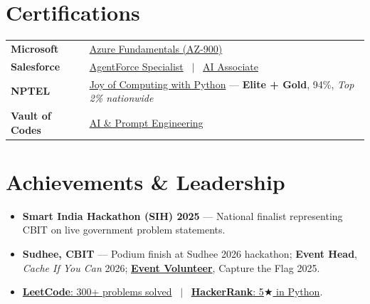 \documentclass[a4paper,10.5pt]{article}
\begin{document}
\section{Certifications}
\vspace{1pt}
\begin{tabularx}{\linewidth}{@{}l X@{}}
\textbf{Microsoft}      & \href{https://drive.google.com/file/d/1Uj9T80eRGSfT8G-HdICgMUi--92Ffz_9/view?usp=share_link}{Azure Fundamentals (AZ-900)} \\[2pt]
\textbf{Salesforce}     & \href{https://drive.google.com/file/d/1ig8ZAgni9Ml1-eQw-yYwkyeQZiyzHk-t/view?usp=share_link}{AgentForce Specialist} \ $|$ \ \href{https://drive.google.com/file/d/12eKyzIrdg2E9JL7Ei6M3PfhkW0PfKh1l/view?usp=sharing}{AI Associate} \\[2pt]
\textbf{NPTEL}          & \href{https://drive.google.com/file/d/1xy7yMiITQlHQ5rMfqnr1E25GgKLNywxe/view?usp=share_link}{Joy of Computing with Python} --- \textbf{Elite + Gold}, 94\%, \textit{Top 2\% nationwide} \\[2pt]
\textbf{Vault of Codes} & \href{https://drive.google.com/file/d/1ZCG5hGw_KajViTB6CHOn3X3Br9BgI-SM/view?usp=share_link}{AI \& Prompt Engineering} \\
\end{tabularx}

\section{Achievements \& Leadership}
\vspace{1pt}
\begin{itemize}[nosep, leftmargin=1.5em, itemsep=1pt]
  \item[--] \textbf{Smart India Hackathon (SIH) 2025} --- National finalist representing CBIT on live government problem statements.
  \item[--] \textbf{Sudhee, CBIT} --- Podium finish at Sudhee 2026 hackathon; \textbf{Event Head}, \textit{Cache If You Can} 2026; \href{https://drive.google.com/file/d/1yupQx853bTCgPQpJUgdcno5PdC6kmpVC/view?usp=share_link}{\textbf{Event Volunteer}}, Capture the Flag 2025.
  \item[--] \href{https://leetcode.com/u/SESH_MANUVARTHI/}{\textbf{LeetCode}: 300+ problems solved} \ $|$ \ \href{https://www.hackerrank.com/profile/seshmanuvarthi27}{\textbf{HackerRank}: 5$\bigstar$ in Python}.
\end{itemize}
\end{document}

